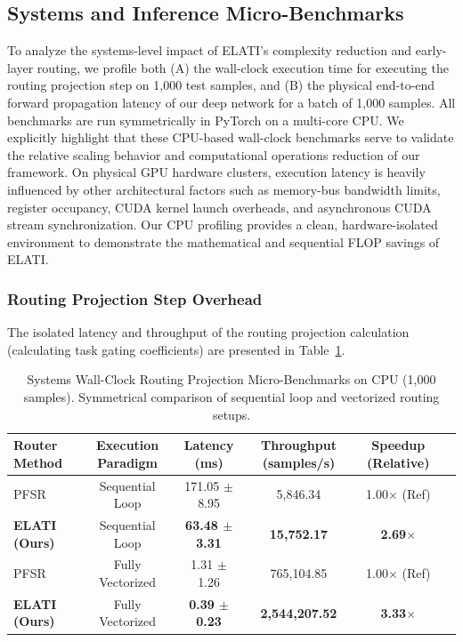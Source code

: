 \subsection{Systems and Inference Micro-Benchmarks}
To analyze the systems-level impact of ELATI's complexity reduction and early-layer routing, we profile both (A) the wall-clock execution time for executing the routing projection step on 1,000 test samples, and (B) the physical end-to-end forward propagation latency of our deep network for a batch of 1,000 samples.
All benchmarks are run symmetrically in PyTorch on a multi-core CPU. We explicitly highlight that these CPU-based wall-clock benchmarks serve to validate the relative scaling behavior and computational operations reduction of our framework. On physical GPU hardware clusters, execution latency is heavily influenced by other architectural factors such as memory-bus bandwidth limits, register occupancy, CUDA kernel launch overheads, and asynchronous CUDA stream synchronization. Our CPU profiling provides a clean, hardware-isolated environment to demonstrate the mathematical and sequential FLOP savings of ELATI.

\subsubsection{Routing Projection Step Overhead}
The isolated latency and throughput of the routing projection calculation (calculating task gating coefficients) are presented in Table~\ref{tab:latency}.

\begin{table}[ht]
\caption{Systems Wall-Clock Routing Projection Micro-Benchmarks on CPU (1,000 samples). Symmetrical comparison of sequential loop and vectorized routing setups.}
\label{tab:latency}
\vskip 0.15in
\begin{center}
\begin{small}
\begin{sc}
\begin{tabular}{lccccr}
\toprule
Router Method & Execution Paradigm & Latency (ms) & Throughput (samples/s) & Speedup (Relative) \\
\midrule
PFSR & Sequential Loop & 171.05 $\pm$ 8.95 & 5,846.34 & 1.00$\times$ (Ref) \\
\textbf{ELATI (Ours)} & Sequential Loop & \textbf{63.48 $\pm$ 3.31} & \textbf{15,752.17} & \textbf{2.69$\times$} \\
\midrule
PFSR & Fully Vectorized & 1.31 $\pm$ 1.26 & 765,104.85 & 1.00$\times$ (Ref) \\
\textbf{ELATI (Ours)} & Fully Vectorized & \textbf{0.39 $\pm$ 0.23} & \textbf{2,544,207.52} & \textbf{3.33$\times$} \\
\bottomrule
\end{tabular}
\end{sc}
\end{small}
\end{center}
\vskip -0.1in
\end{table}


